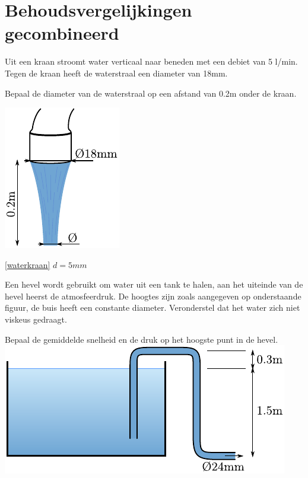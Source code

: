 \chapter{Behoudsvergelijkingen gecombineerd}
\label{sec:Behoudsvergelijkingen gecombineerd}
\begin{toepassing}[*]
	\label{waterkraan}
Uit een kraan stroomt water verticaal naar beneden met een debiet van 5 l/min. Tegen de kraan heeft de waterstraal een diameter van 18mm. 

Bepaal de diameter van de waterstraal op een afstand van 0.2m onder de kraan.

	\centering
	\includegraphics{fig/behoudsvergelijkingen/waterkraan}

\end{toepassing}
\begin{antwoord}{\ref{waterkraan}}
	$d = 5\unit{mm}$
\end{antwoord}
\vfill
\begin{toepassing}[*]
	\label{hevel}
Een hevel wordt gebruikt om water uit een tank te halen, aan het uiteinde van de hevel heerst de atmosfeerdruk. De hoogtes zijn zoals aangegeven op onderstaande figuur, de buis heeft een constante diameter. Veronderstel dat het water zich niet viskeus gedraagt.
		
Bepaal de gemiddelde snelheid en de druk op het hoogste punt in de hevel.
	\centering
	\includegraphics{fig/behoudsvergelijkingen/hevel}

\end{toepassing}
